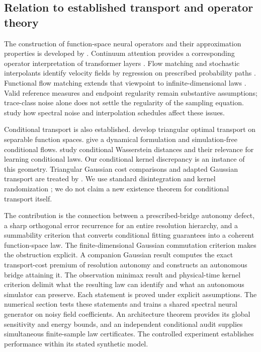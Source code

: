 \subsection{Relation to established transport and operator theory}
The construction of function-space neural operators and their approximation properties is developed by \citet{kovachki2023}. Continuum attention provides a corresponding operator interpretation of transformer layers \citep{calvello2024}. Flow matching and stochastic interpolants identify velocity fields by regression on prescribed probability paths \citep{lipman2023,albergo2023}. Functional flow matching extends that viewpoint to infinite-dimensional laws \citep{kerrigan2024functional}. Valid reference measures and endpoint regularity remain substantive assumptions; trace-class noise alone does not settle the regularity of the sampling equation. \citet{chen2026} study how spectral noise and interpolation schedules affect these issues.

Conditional transport is also established. \citet{hosseini2025} develop triangular optimal transport on separable function spaces. \citet{kerrigan2024conditional} give a dynamical formulation and simulation-free conditional flows. \citet{chemseddine2025} study conditional Wasserstein distances and their relevance for learning conditional laws. Our conditional kernel discrepancy is an instance of this geometry. Triangular Gaussian cost comparisons and adapted Gaussian transport are treated by \citet{bukin2018,acciaio2025}. We use standard disintegration and kernel randomization \citep{kallenberg2021}; we do not claim a new existence theorem for conditional transport itself.

The contribution is the connection between a prescribed-bridge autonomy defect, a sharp orthogonal error recurrence for an entire resolution hierarchy, and a summability criterion that converts conditional fitting guarantees into a coherent function-space law. The finite-dimensional Gaussian commutation criterion makes the obstruction explicit. A companion Gaussian result computes the exact transport-cost premium of resolution autonomy and constructs an autonomous bridge attaining it. The observation minimax result and physical-time kernel criterion delimit what the resulting law can identify and what an autonomous simulator can preserve. Each statement is proved under explicit assumptions. The numerical section tests these statements and trains a shared spectral neural generator on noisy field coefficients. An architecture theorem provides its global sensitivity and energy bounds, and an independent conditional audit supplies simultaneous finite-sample law certificates. The controlled experiment establishes performance within its stated synthetic model.

